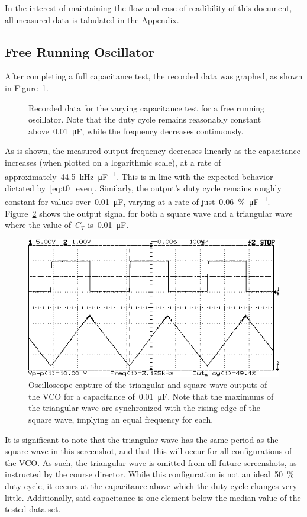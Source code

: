 In the interest of maintaining the flow and ease of readibility of this
document, all measured data is tabulated in the Appendix.

\subsection{Free Running Oscillator}
After completing a full capacitance test, the recorded data was graphed, as
shown in Figure~\ref{fig:free_run_c}.
%
\begin{figure}[H]
	\centering
	
	\parbox{.6\textwidth}{
	\caption[Free Running Oscillator --- Varying $C_T$]{Recorded data for the
	varying capacitance test for a free running oscillator.  Note that the duty
	cycle remains reasonably constant above~\SI{0.01}{\micro\farad}, while the
	frequency decreases continuously.}
	\label{fig:free_run_c}}
\end{figure}
%
As is shown, the measured output frequency decreases linearly as the
capacitance increases (when plotted on a logarithmic scale), at a rate of
approximately~\SI{44.5}{\kilo\hertz\per\micro\farad}.  This is in line with the
expected behavior dictated by~\eqref{eq:t0_even}.  Similarly, the output's duty
cycle remains roughly constant for values over~\SI{0.01}{\micro\farad}, varying
at a rate of just~\SI{0.06}{\percent\per\micro\farad}.  Figure~\ref{fig:shot1}
shows the output signal for both a square wave and a triangular wave where the
value of~$C_T$ is~\SI{0.01}{\micro\farad}.
%
\begin{figure}[H]
	\centering
	\includegraphics[width=.6\textwidth]{img/shot/shot1.png}
	\parbox{.6\textwidth}{
	\caption[Free Running Oscillator --- Varying~$C_T$ at~\SI{49.9}{\percent}
	Duty Cycle]{Oscilloscope capture of the triangular and square wave outputs
	of the VCO for a capacitance of~\SI{0.01}{\micro\farad}.  Note that the
	maximums of the triangular wave are synchronized with the rising edge of
	the square wave, implying an equal frequency for each.}
	\label{fig:shot1}}
\end{figure}
%
It is significant to note that the triangular wave has the same period as the
square wave in this screenshot, and that this will occur for all configurations
of the VCO.  As such, the triangular wave is omitted from all future
screenshots, as instructed by the course director.  While this configuration is
not an ideal~\SI{50}{\percent} duty cycle, it occurs at the capacitance above which
the duty cycle changes very little.  Additionally, said capacitance is one
element below the median value of the tested data set.

